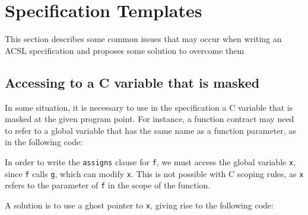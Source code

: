 \section{Specification Templates}\label{sec:spec-templ}
This section describes some common issues that may occur when writing
an ACSL specification and proposes some solution to overcome them

\subsection{Accessing to a C variable that is masked}

In some situation, it is necessary to use in the specification a C
variable that is masked at the given program point. For instance, a
function contract may need to refer to a global variable that has the
same name as a function parameter, as in the following code:



In order to write the \verb|assigns| clause for \verb|f|, we must
access the global variable \verb|x|, since \verb|f| calls \verb|g|,
which can modify \verb|x|. This is not possible with C scoping rules,
as \verb|x| refers to the parameter of \verb|f| in the scope of the
function.

A solution is to use a ghost pointer to \verb|x|, giving
rise to the following code:




